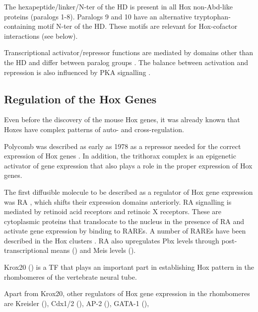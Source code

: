 The hexapeptide/linker/\ac{N-ter} of the \ac{HD} is present in all Hox non-Abd-like proteins (paralogs 1-8). Paralogs 9 and 10 have an alternative tryptophan-containing motif \ac{N-ter} of the \ac{HD}. These motifs are relevant for Hox-cofactor interactions (see below).

Transcriptional activator/repressor functions are mediated by domains other than the \ac{HD} and differ between paralog groups \cite{ref}. The balance between activation and repression is also influenced by \ac{PKA} signalling \parencite{Saleh2000a}.

\subsection{Regulation of the Hox Genes}

Even before the discovery of the mouse Hox genes, it was already known that Hoxes have complex patterns of auto- and cross-regulation. 


Polycomb was described as early as 1978 as a repressor needed for the correct expression of Hox genes \parencite{Lewis1978}. In addition, the trithorax complex is an epigenetic activator of gene expression that also plays a role in the proper expression of Hox genes.%

The first diffusible molecule to be described as a regulator of Hox gene expression was \ac{RA} \parencite{Simeone1990}, which shifts their expression domains anteriorly. \ac{RA} signalling is mediated by retinoid acid receptors and retinoic X receptors. These are cytoplasmic proteins that translocate to the nucleus in the presence of \ac{RA} and activate gene expression by binding to \acp{RARE}. A number of \acp{RARE} have been described in the Hox clusters \cite{refs}.  \ac{RA} also upregulates Pbx levels through post-transcriptional means (\cite{Knoepfler1997a}) and Meis levels (\cite{ref}). %

Krox20 (\cite{Swiatek1993}) is a \ac{TF} that plays an important part in establishing Hox pattern in the rhombomeres of the vertebrate neural tube. %

Apart from Krox20, other regulators of Hox gene expression in the rhombomeres are Kreisler (\cite{ref}), Cdx1/2 (\cite{refs}), AP-2 (\cite{refs}), GATA-1 (\cite{ref}), %


